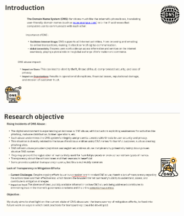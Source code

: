 \begin{figure}[H]
  \centering
  \begin{subfigure}[b]{0.55\textwidth}
    \includegraphics[width=\textwidth]{appendix/pre3.png}
    \label{fig:left}
  \end{subfigure}
  \hfill %
  \begin{subfigure}[b]{0.55\textwidth}
    \includegraphics[width=\textwidth]{appendix/pre4.png}
    \label{fig:right}
  \end{subfigure}
  \label{fig:images}
\end{figure}

